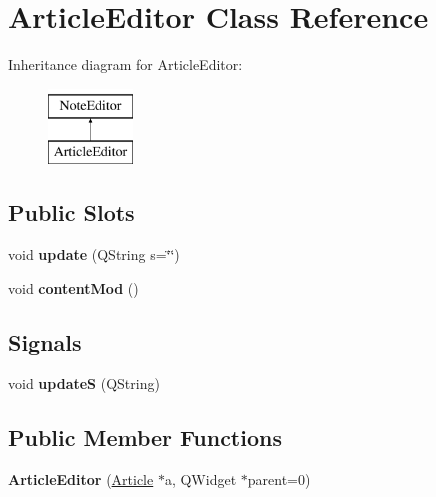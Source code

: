 \hypertarget{classArticleEditor}{\section{\-Article\-Editor \-Class \-Reference}
\label{classArticleEditor}
}
\-Inheritance diagram for \-Article\-Editor\-:\begin{figure}[H]
\begin{center}
\leavevmode
\includegraphics[height=2.000000cm]{classArticleEditor}
\end{center}
\end{figure}
\subsection*{\-Public \-Slots}
\begin{DoxyCompactItemize}
\item 
\hypertarget{classArticleEditor_a859f265d06e8cf80e45e26b1e1d11be4}{void {\bfseries update} (\-Q\-String s=\char`\"{}\char`\"{})}\label{classArticleEditor_a859f265d06e8cf80e45e26b1e1d11be4}

\item 
\hypertarget{classArticleEditor_a2f371197ece3d2e741ae1676748399d8}{void {\bfseries content\-Mod} ()}\label{classArticleEditor_a2f371197ece3d2e741ae1676748399d8}

\end{DoxyCompactItemize}
\subsection*{\-Signals}
\begin{DoxyCompactItemize}
\item 
\hypertarget{classArticleEditor_af7b571d5064e2871eb8905497b538cc6}{void {\bfseries update\-S} (\-Q\-String)}\label{classArticleEditor_af7b571d5064e2871eb8905497b538cc6}

\end{DoxyCompactItemize}
\subsection*{\-Public \-Member \-Functions}
\begin{DoxyCompactItemize}
\item 
\hypertarget{classArticleEditor_a05614b57049ba0db303a571b1a8d516b}{{\bfseries \-Article\-Editor} (\hyperlink{classArticle}{\-Article} $\ast$a, \-Q\-Widget $\ast$parent=0)}\label{classArticleEditor_a05614b57049ba0db303a571b1a8d516b}

\end{DoxyCompactItemize}
